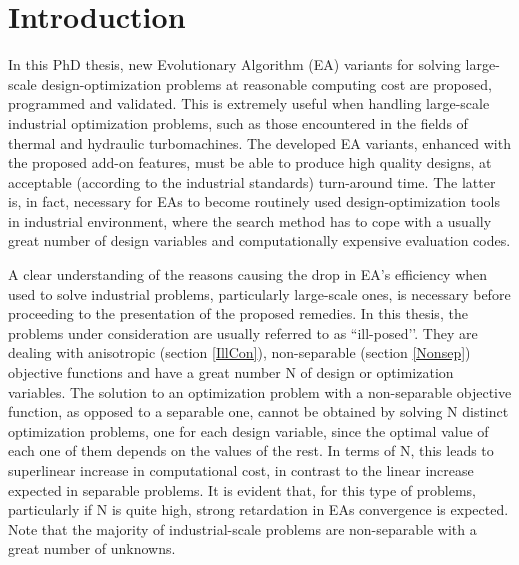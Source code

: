 
\chapter{Introduction}

\ifpdf
    \graphicspath{{1_introduction/figures/PNG/}{1_introduction/figures/PDF/}{1_introduction/figures/}}
\else
    \graphicspath{{1_introduction/figures/EPS/}{1_introduction/figures/}}
\fi

In this PhD thesis, new Evolutionary Algorithm (EA) variants for solving large-scale design-optimization problems at reasonable computing cost are proposed, programmed and validated. This is extremely useful when handling large-scale industrial optimization problems, such as those encountered in the fields of thermal and hydraulic turbomachines. The developed EA variants, enhanced with the proposed add-on features, must be able to produce high quality designs, at acceptable (according to the industrial standards) turn-around time. The latter is, in fact, necessary for EAs to become routinely used design-optimization tools in industrial environment, where the search method has to cope with a usually great number of design variables and computationally expensive evaluation codes.
 
A clear understanding of the reasons causing the drop in EA’s efficiency when used to solve industrial problems, particularly large-scale ones, is necessary before proceeding to the presentation of the proposed remedies. In this thesis, the problems under consideration are usually referred to as ``ill-posed’’. They are dealing with anisotropic (section \ref{IllCon}), non-separable (section \ref{Nonsep}) objective functions and have a great number N of design or optimization variables. The solution to an optimization problem  with a non-separable objective function, as opposed to a separable one, cannot be obtained by solving N distinct optimization problems, one for each design variable, since the optimal value of each one of them depends on the values of the rest. In terms of N, this leads to superlinear increase in computational cost, in contrast to the linear increase expected in separable problems. It is evident that, for this type of problems, particularly if N is quite high, strong retardation in EAs convergence is expected. Note that the majority of industrial-scale problems are non-separable with a great number of unknowns.
 
